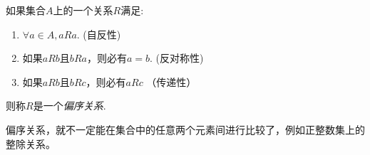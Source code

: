 \begin{definition}
  如果集合$A$上的一个关系$R$满足:
  \begin{enumerate}
  \item $\forall a \in A, aRa$. (自反性)
  \item 如果$aRb$且$bRa$，则必有$a=b$. (反对称性)
  \item 如果$aRb$且$bRc$，则必有$aRc$ （传递性）
  \end{enumerate}
  则称$R$是一个\emph{偏序关系}.
\end{definition}
偏序关系，就不一定能在集合中的任意两个元素间进行比较了，例如正整数集上的整除关系。

